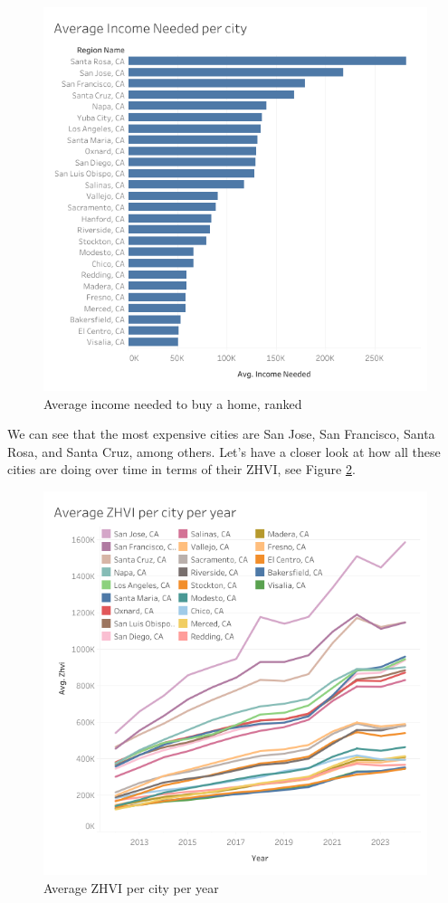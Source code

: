 \documentclass[journal]{IEEEtran}
\begin{document}
\begin{figure}
	\centering
	\includegraphics[width=\linewidth]{income-needed.png}
	\caption{Average income needed to buy a home, ranked}
	\label{fig:income-needed}
\end{figure}

We can see that the most expensive cities are San Jose, San Francisco, Santa
Rosa, and Santa Cruz, among others. Let’s have a closer look at how all these
cities are doing over time in terms of their ZHVI, see Figure \ref{fig:zhvi-year}.

\begin{figure}[!htb]
	\centering
	\includegraphics[width=1\linewidth]{zhvi-year.png}
	\caption{Average ZHVI per city per year}
	\label{fig:zhvi-year}
\end{figure}
\end{document}
